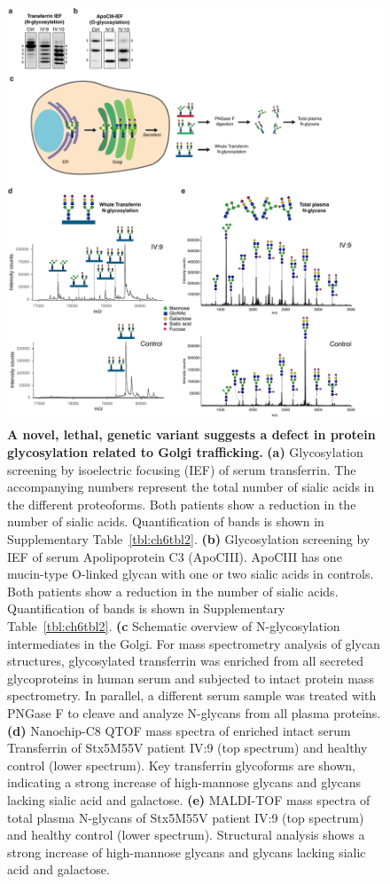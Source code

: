 \begin{figure}
    \includegraphics[keepaspectratio=true,width=\textwidth,height=\textheight]{chapters/chapter6/chapter6_Figure1.pdf}
    \caption{\textbf{A novel, lethal, genetic variant suggests a defect in protein glycosylation related to Golgi trafficking.} \textbf{(a)} Glycosylation screening by isoelectric focusing (IEF) of serum transferrin. The accompanying numbers represent the total number of sialic acids in the different proteoforms. Both patients show a reduction in the number of sialic acids. Quantification of bands is shown in Supplementary Table~\ref{tbl:ch6tbl2}. \textbf{(b)} Glycosylation screening by IEF of serum Apolipoprotein C3 (ApoCIII). ApoCIII has one mucin-type O-linked glycan with one or two sialic acids in controls. Both patients show a reduction in the number of sialic acids. Quantification of bands is shown in Supplementary Table~\ref{tbl:ch6tbl2}. \textbf{(c} Schematic overview of N-glycosylation intermediates in the Golgi. For mass spectrometry analysis of glycan structures, glycosylated transferrin was enriched from all secreted glycoproteins in human serum and subjected to intact protein mass spectrometry. In parallel, a different serum sample was treated with PNGase F to cleave and analyze N-glycans from all plasma proteins. \textbf{(d)} Nanochip-C8 QTOF mass spectra of enriched intact serum Transferrin of Stx5M55V patient IV:9 (top spectrum) and healthy control (lower spectrum). Key transferrin glycoforms are shown, indicating a strong increase of high-mannose glycans and glycans lacking sialic acid and galactose. \textbf{(e)} MALDI-TOF mass spectra of total plasma N-glycans of Stx5M55V patient IV:9 (top spectrum) and healthy control (lower spectrum). Structural analysis shows a strong increase of high-mannose glycans and glycans lacking sialic acid and galactose.}
    \label{fig:ch6fig1}
\end{figure}

